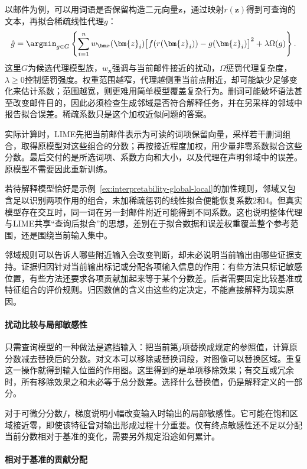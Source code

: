 以邮件为例，可以用词语是否保留构造二元向量$\bm{z}$，通过映射$r(\bm{z})$得到可查询的文本，再拟合稀疏线性代理$g$：
\begin{equation}
 \hat g=\argmin_{g\in G}\left\{
 \sum_{i=1}^{n}w_{\bm x}(\bm{z}_i)
 \bigl[f(r(\bm{z}_i))-g(\bm{z}_i)\bigr]^2
 +\lambda\Omega(g)\right\}.
 \label{eq:interpretability-lime}
\end{equation}
这里$G$为候选代理模型族，$w_{\bm x}$强调与当前邮件接近的扰动，$\Omega$惩罚代理复杂度，$\lambda\geq0$控制惩罚强度。权重范围越窄，代理越侧重当前点附近，却可能缺少足够变化来估计系数；范围越宽，则更难用简单模型覆盖复杂行为。删词可能破坏语法甚至改变邮件目的，因此必须检查生成邻域是否符合解释任务，并在另采样的邻域中报告拟合误差。稀疏系数只是这个加权近似问题的答案。

实际计算时，LIME先把当前邮件表示为可读的词项保留向量，采样若干删词组合，取得原模型对这些组合的分数；再按接近程度加权，用少量非零系数拟合这些分数。最后交付的是所选词项、系数方向和大小，以及代理在声明邻域中的误差。原模型不需要因此重新训练。

若待解释模型恰好是示例~\ref{ex:interpretability-global-local}的加性规则，邻域又包含足以识别两项作用的组合，未加稀疏惩罚的线性拟合便能恢复系数2和4。但真实模型存在交互时，同一词在另一封邮件附近可能得到不同系数。这也说明整体代理与LIME共享“查询后拟合”的思想，差别在于拟合数据和误差权重覆盖整个参考范围，还是围绕当前输入集中。

邻域规则可以告诉人哪些附近输入会改变判断，却未必说明当前输出由哪些证据支持。证据归因针对当前输出标记或分配各项输入信息的作用：有些方法只标记敏感位置，有些方法还要求各项贡献加起来等于某个分数差。后者需要固定比较基准或特征组合的评价规则。归因数值的含义由这些约定决定，不能直接解释为现实原因。

\paragraph{扰动比较与局部敏感性}

只需查询模型的一种做法是遮挡输入：把当前第$j$项替换成规定的参照值，计算原分数减去替换后的分数。对文本可以移除或替换词段，对图像可以替换区域。重复这一操作就得到输入位置的作用图。这里得到的是单项移除效果；有交互或冗余时，所有移除效果之和未必等于总分数差。选择什么替换值，仍是解释定义的一部分。

对于可微分分数$f$，梯度说明小幅改变输入时输出的局部敏感性。它可能在饱和区域接近零，即使该特征曾对输出形成过程十分重要。仅有终点敏感性还不足以分配当前分数相对于基准的变化，需要另外规定沿途如何累计。

\paragraph{相对于基准的贡献分配}
\label{sec:interpretability-local-attribution}

